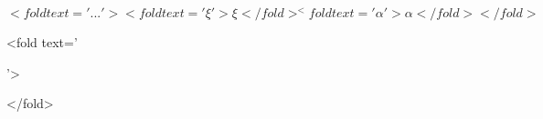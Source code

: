 \begin{equation}<fold text='...'>
    <fold text='ξ'>\xi</fold>^<fold text='α'>\alpha</fold>
</fold>\end{equation}

<fold text='\usepackage{...}'>\usepackage{tikz}</fold>
